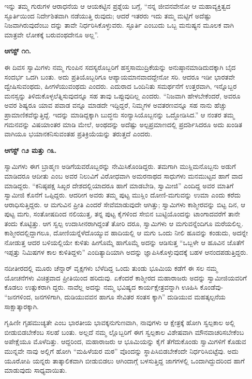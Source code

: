 ಇನ್ನು ತಮ್ಮ ಗುರುಗಳ ಆರಾಧನೆಯ ಆ ಆಯಕಟ್ಟಿನ ಪ್ರಶ್ನೆಯ ಬಗ್ಗೆ, “ನನ್ನ ಜೀವನವೇನೋ ಆ ಮಹಾವ್ಯಕ್ತಿತ್ವದ ಸ್ಫೂರ್ತಿಯಿಂದ ನಿರ್ದೇಶಿತವಾಗಿ ನಡೆಯುತ್ತಿ ರುವುದು; ಆದರೆ ಇತರರು ಇದು ತಮ್ಮ ಮಟ್ಟಿಗೆ ಅದೆಷ್ಟು ನಿಜವಾಗಿರುವುದೆಂಬು ದನ್ನು ತಾವೇ ನಿರ್ಧರಿಸಿಕೊಳ್ಳುವರು. ಸ್ಫೂರ್ತಿ ಎಂಬುದು ಒಬ್ಬ ಮನುಷ್ಯನ ಮೂಲಕ ವಾಗಿ ಮಾತ್ರವೇ ಲೋಕಕ್ಕೆ ಬರುವಂಥದೇನೂ ಅಲ್ಲ”.

\textbf{ಆಗಸ್ಟ್ ೧೧.}

ಈ ದಿವಸ ಸ್ವಾಮಿಗಳು ನಮ್ಮ ಗುಂಪಿನ ಸದಸ್ಯರೊಬ್ಬರಿಗೆ ಹಸ್ತಸಾಮುದ್ರಿಕೆಯನ್ನು ಅನುಷ್ಠಾನಮಾಡಿದುದಕ್ಕಾಗಿ ಬೈದ ಸಂದರ್ಭ ಒದಗಿ ಬಂತು. ಅದು ಪ್ರತಿಯೊಬ್ಬರಿಗೂ ಆಪ್ಯಾಯಮಾನವಾದದ್ದೇನೋ ಸರಿ. ಆದರೂ ಇಡೀ ಭಾರತವೇ ದ್ವೇಷಿಸುವಂಥದು, ಹೀಗಳೆಯುವಂಥದು ಎಂದರು. ಎದುರಾದ ಒಂದಿನಿತು ಸಮರ್ಥನೆಗೆ ಉತ್ತರವಾಗಿ, ಇನ್ನೊಬ್ಬರ ಮನಸ್ಸನ್ನು ತಿಳಿದುಕೊಳ್ಳಲೆತ್ನಿಸುವುದನ್ನೂ ಸಹ ತಾವು ಒಪ್ಪುವುದಿಲ್ಲ ಎಂದರು. “ನಿಜವಾಗಿ ಹೇಳಬೇಕೆಂದರೆ, ಅವರೂ ಅವರ ಶಿಷ್ಯರೂ ಯಾವ ಪವಾಡ ವನ್ನೂ ಮಾಡದೇ ಇದ್ದಿದ್ದರೆ, ನಿಮ್ಮಗಳ ಅವತರಣವನ್ನೂ ಸಹ ನಾನು ಹೆಚ್ಚು ಪ್ರಾಮಾಣಿಕವೆನ್ನುತ್ತಿದ್ದೆ. ಇದನ್ನು ಮಾಡಿದ್ದಕ್ಕಾಗಿ ಬುದ್ಧನು ಸಂನ್ಯಾಸಿಯೊಬ್ಬನನ್ನು ಒದ್ದೋಡಿಸಿದ.” ಆ ನಂತರ ತಮ್ಮ ಗಮನವನ್ನು ವಿಷಯಾಂತರ ಮಾಡಿ ಮೇಲೆ, ಅಂಥದನ್ನು ಅದೆಷ್ಟು ಅಲ್ಪಪ್ರಮಾಣದಲ್ಲಿ ಪ್ರದರ್ಶಿಸಿದರೂ ಅದು ಖಂಡಿತ ವಾಗಿಯೂ ಭಯಾನಕನಿಸುವಂತಹ ಪ್ರತಿಕ್ರಿಯೆಯನ್ನು ತರುತ್ತದೆ ಎಂದರು.

\textbf{ಆಗಸ್ಟ್ ೧೨ ಮತ್ತು ೧೩.
 }

ಸ್ವಾಮಿಗಳು ಈಗ ಬ್ರಾಹ್ಮಣ ಅಡಿಗೆಯವರೊಬ್ಬರನ್ನು ನೇಮಿಸಿಕೊಂಡಿದ್ದರು. ತಮಗಾಗಿ ಮುಸ್ಲಿಮನೊಬ್ಬನು ಅಡುಗೆ ಮಾಡಿದರೂ ಆದೀತು ಎಂಬ ಅವರ ನಿಲುವಿಗೆ ವಿರೋಧವಾಗಿ ಅಮರನಾಥದ ಸಾಧುಗಳು ಮನಮುಟ್ಟವ ಹಾಗೆ ವಾದ ಮಾಡಿದ್ದರು. “ಕನಿಷ್ಠಪಕ್ಷ ಸಿಖ್ಖರ ದೇಶದಲ್ಲಿಯಾದರೂ ಹಾಗೆ ಮಾಡಬೇಡಿ, ಸ್ವಾಮೀಜಿ” ಎಂದಿದ್ದ ಅವರ ಮಾತಿಗೆ ಸ್ವಾಮೀಜಿ ಕೊನೆಗೆ ಒಪ್ಪಿದ್ದರು. ಆದರೀಗ ಅವರು ತಮ್ಮ ಪುಟ್ಟ ಮುಸ್ಲಿಂ ದೋಣಿ-ಮಗುವನ್ನು ಉಮಾ ಎಂದು ಕರೆದು ಆರಾಧಿಸುತ್ತಿದ್ದರು. ಆ ಮಗುವಿನ ಪ್ರೀತಿ ಎಂದರೆ ಸೇವೆಮಾಡುವುದೇ ಆಗಿತ್ತು; ಸ್ವಾಮಿಗಳು ಕಾಶ್ಮೀರವನ್ನು ಬಿಟ್ಟ ದಿನ, ಆ ಪುಟ್ಟ ಮಗು, ಸಂತೋಷದಿಂದ ನಲಿಯುತ್ತ, ತನ್ನ ಪುಟ್ಟ ಕೈಗಳಿಂದ ಸೇಬಿನ ಬುಟ್ಟಿಯೊಂದನ್ನು ಟಾಂಗಾದವರೆಗೆ ತಾನೇ ತಂದು ಕೊಟ್ಟಿತ್ತು. ಆಗ ಸ್ವಲ್ಪ ಉದಾಸೀನರಾಗಿದ್ದಂತೆ ತೋರಿ ದರೂ, ಸ್ವಾಮಿಗಳು ಆ ಮಗುವನ್ನೆಂದಿಗೂ ಮರೆಯಲಿಲ್ಲ. ಕಾಶ್ಮೀರದಲ್ಲಿದ್ದಾಗಲೂ, ದೋಣಿಯನ್ನೆಳೆದೊಯ್ಯುವ ಹಾದಿಯಲ್ಲಿ ಆ ಮಗು ಒಂದು ನೀಲಿ ಹೂವನ್ನು ಕಂಡುದು, ಅದನ್ನೇ ನೋಡುತ್ತ ಆದರ ಬಳಿಯಲ್ಲಿಯೇ ಕುಳಿತು ಹೀಗೊಮ್ಮೆ ಹಾಗೊಮ್ಮೆ ಅದನ್ನು ಆಡಿಸುತ್ತ “ಒಬ್ಬಳೇ ಆ ಹೂವಿನ ಜೊತೆಗೆ ಇಪ್ಪತ್ತು ನಿಮಿಷಗಳ ಕಾಲ ಕುಳಿತಿದ್ದಳು” ಎಂದಿತ್ಯಾದಿಯಾಗಿ ಅದನ್ನು ಜ್ಞಾಪಿಸಿಕೊಳ್ಳುವುದಕ್ಕೆ ಬಹಳ ಆನಂದಪಡುತ್ತಿದ್ದರು.

ನದೀತೀರದಲ್ಲಿ ಮೂರು ಚೆನ್ನಾರ್ ವೃಕ್ಷಗಳು ಬೆಳೆದಿದ್ದ ಒಂದು ತುಂಡು ಭೂಮಿಯ ಕಡೆಗೆ ಈ ಸಲ ನಮ್ಮ ಯೋಚನೆಗಳು ವಿಚಿತ್ರವಾದ ಪ್ರೀತಿಯಿಂದ ಹರಿದುವು. ಏಕೆಂದರೆ ಕಾಶ್ಮೀರದ ಮಹಾರಾಜರು ಅದನ್ನು ಸ್ವಾಮೀಜಿಯವರಿಗೆ ಕೊಡಲು ಉತ್ಸುಕರಾಗಿ ದ್ದರು. ನಾವೆಲ್ಲ ಅದನ್ನು ನಮ್ಮ ಭವಿಷ್ಯದ ಕಾರ್ಯಕ್ಷೇತ್ರವನ್ನಾಗಿ ಊಹಿಸಿ ಕೊಂಡೆವು- “ಜನಗಳಿಂದ, ಜನಗಳಿಗಾಗಿ, ದುಡಿಯುವವನ ಹಾಗೂ ಸೇವಿತರ ಸಂತಸ ಕ್ಕಾಗಿ” ದುಡಿಯುವ ಮಹತ್ಕಲ್ಪನೆಯ ಸಾಕ್ಷಾತ್ಕಾರಕ್ಕಾಗಿ.

ಗೃಹಿಣೀ ಗೃಹಮುಚ್ಯತೇ ಎಂಬ ಭಾರತೀಯ ಭಾವಕ್ಕನುಗುಣವಾಗಿ, ನಾವುಗಳು ಆ ಕ್ಷೇತ್ರಕ್ಕೆ ಹೋಗಿ ಸ್ವಲ್ಪಕಾಲ ಅಲ್ಲಿ ಬೀಡುಬಿಡಬೇಕೆಂಬ ಸಲಹೆ ಬಂತು. ಅಲ್ಲದೆ ನಮ್ಮ ಲ್ಲೊಬ್ಬರಿಗೆ ಈಗ ಸ್ವಲ್ಪಕಾಲ ವಿಶೇಷವಾಗಿ ಮೌನವಾಚರಿಸಬೇಕೆಂಬ ಅಪೇಕ್ಷೆಯೂ ಮೊಳೆದಿತ್ತು. ಆದ್ದರಿಂದ, ಮಹಾರಾಜರು ಆ ಭೂಮಿಯನ್ನು ಕೈಗೆ ತೆಗೆದುಕೊಂಡು ಸ್ವಾಮಿಗಳಿಗೆ ಕೊಡುವ ಮುನ್ನವೇ ನಾವು ಅಲ್ಲಿಗೆ ಹೋಗಿ “ಮಹಿಳೆಯರ ಮಠ” ವೊಂದನ್ನು ಸ್ಥಾಪಿಸಿಬಿಡಬೇಕೆಂದೇ ನಿರ್ಧರಿಸಿಬಿಟ್ಟೆವು. ಅದು ಯೂರೋಪಿ ಯನ್ನರು ತಾತ್ಕಾಲಿಕವಾಗಿ ಬೀಡುಬಿಡಲು ಆಗಿಂದಾಗ್ಗೆ ಬಳಸುತ್ತಿದ್ದ ಜಾಗಗಳಲ್ಲಿ ಒಂದಾಗಿದ್ದುದರಿಂದ ಹಾಗೆ ಮಾಡುವುದು ಸಾಧ್ಯವಾಯಿತು.

